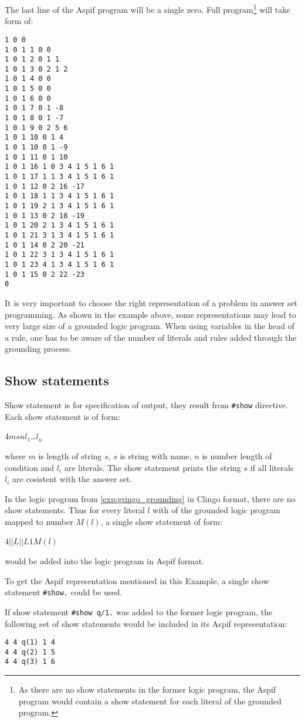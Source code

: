 \begin{example}
    The last line of the Aspif program will be a single zero.
    Full program\footnote{
        As there are no show statements in the former logic program,
        the Aspif program would contain a show statement for each literal
        of the grounded program.
    } will take form of:
    \begin{lstlisting}
1 0 0
1 0 1 1 0 0
1 0 1 2 0 1 1
1 0 1 3 0 2 1 2
1 0 1 4 0 0
1 0 1 5 0 0
1 0 1 6 0 0
1 0 1 7 0 1 -8
1 0 1 8 0 1 -7
1 0 1 9 0 2 5 6
1 0 1 10 0 1 4
1 0 1 10 0 1 -9
1 0 1 11 0 1 10
1 0 1 16 1 0 3 4 1 5 1 6 1
1 0 1 17 1 1 3 4 1 5 1 6 1
1 0 1 12 0 2 16 -17
1 0 1 18 1 1 3 4 1 5 1 6 1
1 0 1 19 2 1 3 4 1 5 1 6 1
1 0 1 13 0 2 18 -19
1 0 1 20 2 1 3 4 1 5 1 6 1
1 0 1 21 3 1 3 4 1 5 1 6 1
1 0 1 14 0 2 20 -21
1 0 1 22 3 1 3 4 1 5 1 6 1
1 0 1 23 4 1 3 4 1 5 1 6 1
1 0 1 15 0 2 22 -23
0
\end{lstlisting}
\end{example}

It is very important to choose the right representation of a problem
in answer set programming. As shown in the example above, some representations
may lead to very large size of a grounded logic program.
When using variables in the head of a rule, one has to be aware
of the number of literals and rules added through the grounding process.

\subsection{Show statements}

Show statement is for specification of output, they result from \texttt{\#show}
directive. Each show statement is of form:
\begin{center}
    4\ms{}$m$\ms{}$s$\ms{}$n$\ms{}$l_1$\ms{}\dots\ms$l_n$
\end{center}
where $m$ is length of string $s$, $s$ is string
with name, $n$ is number length of condition and $l_i$ are literals.
The show statement prints the string $s$ if all literals $l_i$ are cosistent
with the answer set.

\begin{example}
    In the logic program from \cref{exp:gringo_grounding} in Clingo format,
    there are no show statements. Thus for every literal $l$ with of the grounded
    logic program mapped to number $M(l)$, a single show statement of form:
    \begin{center}
        4\ms{}$||L||$\ms{}$L$\ms{}$1$\ms{}$M(l)$
    \end{center}
    would be added into the logic program in Aspif format.

    To get the Aspif representation mentioned in this Example,
    a single show statement \texttt{\#show.} could be used.

    If show statement \texttt{\#show q/1.} was added to the former logic program,
    the following set of show statements would be included in its Aspif
    representation:
    \begin{lstlisting}[firstnumber=26]
4 4 q(1) 1 4
4 4 q(2) 1 5
4 4 q(3) 1 6
\end{lstlisting}
\end{example}

